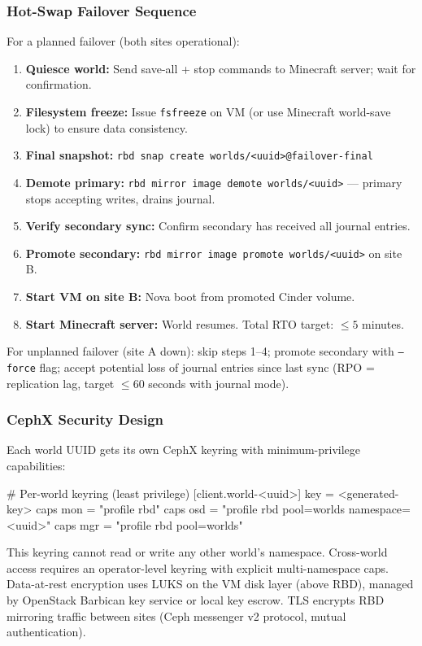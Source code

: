 \documentclass[11pt,letterpaper]{article}
\begin{document}
\subsubsection{Hot-Swap Failover Sequence}

For a planned failover (both sites operational):
\begin{enumerate}
  \item \textbf{Quiesce world:} Send save-all + stop commands to Minecraft server; wait for confirmation.
  \item \textbf{Filesystem freeze:} Issue \texttt{fsfreeze} on VM (or use Minecraft world-save lock) to ensure data consistency.
  \item \textbf{Final snapshot:} \texttt{rbd snap create worlds/<uuid>@failover-final}
  \item \textbf{Demote primary:} \texttt{rbd mirror image demote worlds/<uuid>} --- primary stops accepting writes, drains journal.
  \item \textbf{Verify secondary sync:} Confirm secondary has received all journal entries.
  \item \textbf{Promote secondary:} \texttt{rbd mirror image promote worlds/<uuid>} on site B.
  \item \textbf{Start VM on site B:} Nova boot from promoted Cinder volume.
  \item \textbf{Start Minecraft server:} World resumes. Total RTO target: $\leq 5$ minutes.
\end{enumerate}

For unplanned failover (site A down): skip steps 1--4; promote secondary with \texttt{--force} flag; accept potential loss of journal entries since last sync (RPO = replication lag, target $\leq 60$ seconds with journal mode).

\subsubsection{CephX Security Design}

Each world UUID gets its own CephX keyring with minimum-privilege capabilities:

\begin{asciibox}
# Per-world keyring (least privilege)
[client.world-<uuid>]
  key = <generated-key>
  caps mon = "profile rbd"
  caps osd = "profile rbd pool=worlds namespace=<uuid>"
  caps mgr = "profile rbd pool=worlds"
\end{asciibox}

This keyring cannot read or write any other world's namespace. Cross-world access requires an operator-level keyring with explicit multi-namespace caps. Data-at-rest encryption uses LUKS on the VM disk layer (above RBD), managed by OpenStack Barbican key service or local key escrow. TLS encrypts RBD mirroring traffic between sites (Ceph messenger v2 protocol, mutual authentication).
\end{document}
